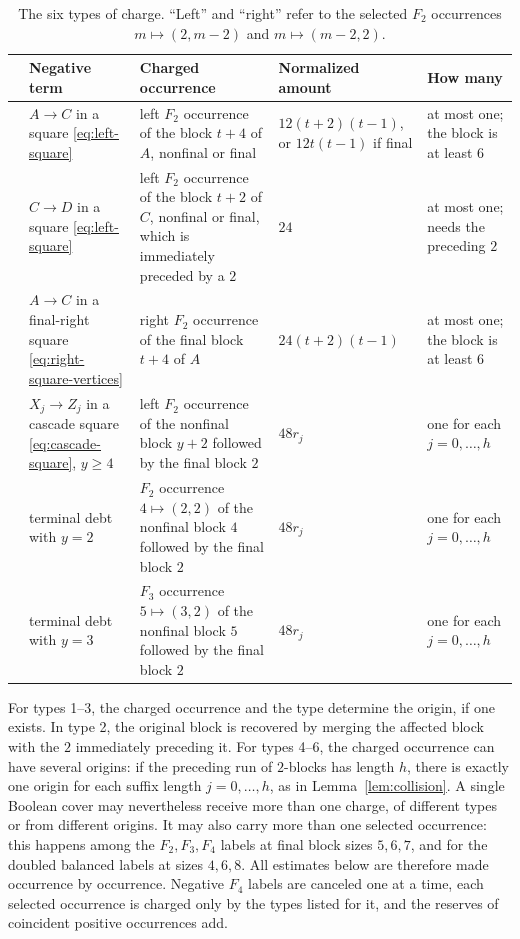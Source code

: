 \documentclass[11pt]{amsart}
\theoremstyle{definition}
\theoremstyle{remark}
\begin{document}
\begin{table}[ht]
\caption{The six types of charge.  ``Left'' and ``right'' refer to the
selected $F_2$ occurrences $m\mapsto(2,m-2)$ and $m\mapsto(m-2,2)$.}
\label{tab:charges}
\small
\begin{tabularx}{\textwidth}{@{}
  >{\raggedright\arraybackslash}p{}
  >{\raggedright\arraybackslash}p{}
  >{\raggedright\arraybackslash}X
  >{\raggedright\arraybackslash}p{}
  >{\raggedright\arraybackslash}p{}@{}}
\toprule
 & Negative term & Charged occurrence & Normalized amount & How many \\
\midrule
1 & $A\to C$ in a square \eqref{eq:left-square}
 & left $F_2$ occurrence of the block $t+4$ of $A$, nonfinal or final
 & $12(t+2)(t-1)$, or $12t(t-1)$ if final
 & at most one; the block is at least $6$ \\
2 & $C\to D$ in a square \eqref{eq:left-square}
 & left $F_2$ occurrence of the block $t+2$ of $C$, nonfinal or final,
   which is immediately preceded by a $2$
 & $24$
 & at most one; needs the preceding $2$ \\
3 & $A\to C$ in a final-right square \eqref{eq:right-square-vertices}
 & right $F_2$ occurrence of the final block $t+4$ of $A$
 & $24(t+2)(t-1)$
 & at most one; the block is at least $6$ \\
4 & $X_j\to Z_j$ in a cascade square \eqref{eq:cascade-square}, $y\ge4$
 & left $F_2$ occurrence of the nonfinal block $y+2$ followed by the
   final block $2$
 & $48r_j$
 & one for each $j=0,\ldots,h$ \\
5 & terminal debt with $y=2$
 & $F_2$ occurrence $4\mapsto(2,2)$ of the nonfinal block $4$ followed by
   the final block $2$
 & $48r_j$
 & one for each $j=0,\ldots,h$ \\
6 & terminal debt with $y=3$
 & $F_3$ occurrence $5\mapsto(3,2)$ of the nonfinal block $5$ followed by
   the final block $2$
 & $48r_j$
 & one for each $j=0,\ldots,h$ \\
\bottomrule
\end{tabularx}
\end{table}

For types 1--3, the charged occurrence and the type determine the
origin, if one exists. In type 2, the original block is recovered by
merging the affected block with the $2$ immediately preceding it.
For types 4--6, the charged occurrence can have several origins:
if the preceding run of $2$-blocks has length $h$, there is exactly
one origin for each suffix length $j=0,\ldots,h$, as in
Lemma~\ref{lem:collision}. A single Boolean cover may nevertheless receive more than one charge, of different types or from different origins.  It may also carry more than one selected occurrence: this happens among the $F_2,F_3,F_4$ labels at final block sizes $5,6,7$, and for the doubled balanced labels at sizes $4,6,8$.  All estimates below are therefore made occurrence by occurrence.  Negative $F_4$ labels are canceled one at a time, each selected occurrence is charged only by the types listed for it, and the reserves of coincident positive occurrences add.
\end{document}
